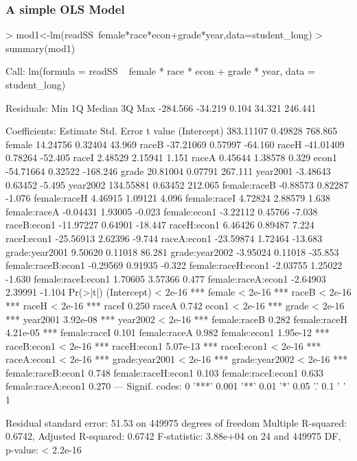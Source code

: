 \documentclass{beamer}
\begin{document}
\begin{frame}
\frametitle{A simple OLS Model}
\begin{Schunk}
\begin{Sinput}
> mod1<-lm(readSS~female*race*econ+grade*year,data=student_long)
> summary(mod1)
\end{Sinput}
\begin{Soutput}
Call:
lm(formula = readSS ~ female * race * econ + grade * year, data = student_long)

Residuals:
     Min       1Q   Median       3Q      Max 
-284.566  -34.219    0.104   34.321  246.441 

Coefficients:
                    Estimate Std. Error  t value
(Intercept)        383.11107    0.49828  768.865
female              14.24756    0.32404   43.969
raceB              -37.21069    0.57997  -64.160
raceH              -41.01409    0.78264  -52.405
raceI                2.48529    2.15941    1.151
raceA                0.45644    1.38578    0.329
econ1              -54.71664    0.32522 -168.246
grade               20.81004    0.07791  267.111
year2001            -3.48643    0.63452   -5.495
year2002           134.55881    0.63452  212.065
female:raceB        -0.88573    0.82287   -1.076
female:raceH         4.46915    1.09121    4.096
female:raceI         4.72824    2.88579    1.638
female:raceA        -0.04431    1.93005   -0.023
female:econ1        -3.22112    0.45766   -7.038
raceB:econ1        -11.97227    0.64901  -18.447
raceH:econ1          6.46426    0.89487    7.224
raceI:econ1        -25.56913    2.62396   -9.744
raceA:econ1        -23.59874    1.72464  -13.683
grade:year2001       9.50620    0.11018   86.281
grade:year2002      -3.95024    0.11018  -35.853
female:raceB:econ1  -0.29569    0.91935   -0.322
female:raceH:econ1  -2.03755    1.25022   -1.630
female:raceI:econ1   1.70605    3.57366    0.477
female:raceA:econ1  -2.64903    2.39991   -1.104
                   Pr(>|t|)    
(Intercept)         < 2e-16 ***
female              < 2e-16 ***
raceB               < 2e-16 ***
raceH               < 2e-16 ***
raceI                 0.250    
raceA                 0.742    
econ1               < 2e-16 ***
grade               < 2e-16 ***
year2001           3.92e-08 ***
year2002            < 2e-16 ***
female:raceB          0.282    
female:raceH       4.21e-05 ***
female:raceI          0.101    
female:raceA          0.982    
female:econ1       1.95e-12 ***
raceB:econ1         < 2e-16 ***
raceH:econ1        5.07e-13 ***
raceI:econ1         < 2e-16 ***
raceA:econ1         < 2e-16 ***
grade:year2001      < 2e-16 ***
grade:year2002      < 2e-16 ***
female:raceB:econ1    0.748    
female:raceH:econ1    0.103    
female:raceI:econ1    0.633    
female:raceA:econ1    0.270    
---
Signif. codes:  0 '***' 0.001 '**' 0.01 '*' 0.05 '.' 0.1 ' ' 1 

Residual standard error: 51.53 on 449975 degrees of freedom
Multiple R-squared: 0.6742,	Adjusted R-squared: 0.6742 
F-statistic: 3.88e+04 on 24 and 449975 DF,  p-value: < 2.2e-16 
\end{Soutput}
\end{Schunk}
\end{frame}
\end{document}
